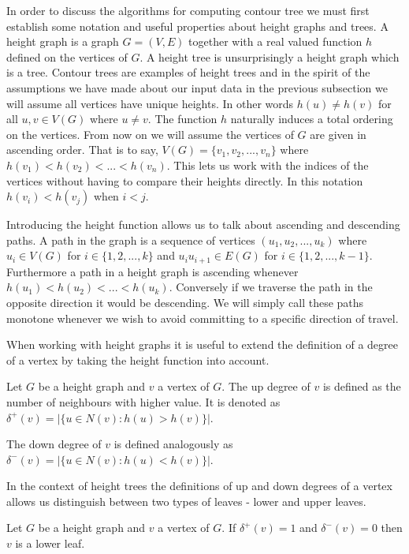 In order to discuss the algorithms for computing contour tree we must first establish some notation and useful properties about height graphs and trees. A height graph is a graph $G = (V, E)$ together with a real valued function $h$ defined on the vertices of $G$. A height tree is unsurprisingly a height graph which is a tree. Contour trees are examples of height trees and in the spirit of the assumptions we have made about our input data in the previous subsection we will assume all vertices have unique heights. In other words $h(u) \ne h(v)$ for all $u ,v \in V(G)$ where $u \ne v$. The function $h$ naturally induces a total ordering on the vertices. From now on we will assume the vertices of $G$ are given in ascending order. That is to say, $V(G) = \{v_1, v_2, ... , v_n\}$ where $h(v_1) < h(v_2) < ... < h(v_n)$. This lets us work with the indices of the vertices without having to compare their heights directly. In this notation $h(v_i) < h(v_j)$ when $i < j$.


Introducing the height function allows us to talk about ascending and descending paths. A path in the graph is a sequence of vertices $(u_1, u_2, ... , u_k)$ where $u_i \in V(G)$ for $i \in \{1, 2, ..., k\}$ and $u_iu_{i+1} \in E(G)$ for $i \in \{1, 2, ..., k-1\}$. Furthermore a path in a height graph is ascending whenever $h(u_1) < h(u_2) < ... < h(u_k)$. Conversely if we traverse the path in the opposite direction it would be descending. We will simply call these paths monotone whenever we wish to avoid committing to a specific direction of travel.

When working with height graphs it is useful to extend the definition of a degree of a vertex by taking the height function into account.

\begin{defn} Let $G$ be a height graph and $v$ a vertex of $G$. The up degree of $v$ is defined as the number of neighbours with higher value. It is denoted as $\delta^+(v) = \big|\{ u \in N(v) : h(u) > h(v) \}\big|$.   \end{defn}

The down degree of $v$ is defined analogously as $\delta^-(v) = \big|\{ u \in N(v) : h(u) < h(v) \}\big|$. 

In the context of height trees the definitions of up and down degrees of a vertex allows us distinguish between two types of leaves - lower and upper leaves.

\begin{defn} Let $G$ be a height graph and $v$ a vertex of $G$. If  $\delta^+(v) = 1$ and $\delta^-(v) = 0$ then $v$ is a lower leaf.  \end{defn}

